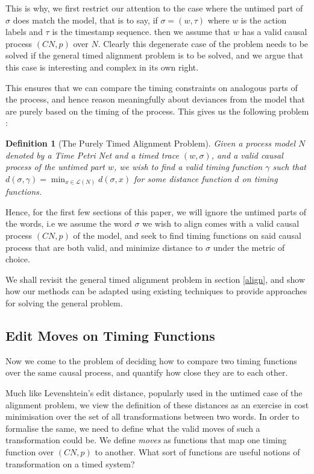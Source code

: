 \documentclass[conference]{IEEEtran}
\newtheorem{definition}{Definition}
\begin{document}
	
	This is why, we first restrict our attention to the case where the untimed part of $\sigma$ does match the model, that is to say, if $\sigma = (w, \tau)$ where $w$ is the action labels and $\tau$ is the timestamp sequence. then we assume that $w$ has a valid causal process $(CN, p)$ over $N$. Clearly this degenerate case of the problem needs to be solved if the general timed alignment problem is to be solved, and we argue that this case is interesting and complex in its own right. 
	
	This ensures that we can compare the timing constraints on analogous parts of the process, and hence reason meaningfully about deviances from the model that are purely based on the timing of the process. This gives us the following problem : 
	
	\begin{definition}[The Purely Timed Alignment Problem]
		Given a process model $N$ denoted by a Time Petri Net and a timed trace $(w, \sigma)$, and a valid causal process of the untimed part $w$, we wish to find a valid timing function $\gamma$ such that $d(\sigma, \gamma) =\min_{x \in \mathcal{L}(N)}{d(\sigma, x)}$ for some distance function $d$ on timing functions. 
	\end{definition}
	
	Hence, for the first few sections of this paper, we will ignore the untimed parts of the words, i.e we assume the word $\sigma$ we wish to align comes with a valid causal process $(CN, p)$ of the model, and seek to find timing functions on said causal process that are both valid, and minimize distance to $\sigma$ under the metric of choice. 
	
	We shall revisit the general timed alignment problem in section \ref{align}, and show how our methods 
	can be adapted using existing techniques to provide approaches for solving the general 
	problem. 
	
	\subsection{Edit Moves on Timing Functions}\label{dualrep}
	Now we come to the problem of deciding how to compare two timing functions over the same causal process, and quantify how close they are to each other. 
	
	Much like Levenshtein's edit distance, popularly used in the untimed case of the alignment problem, we view the definition of these distances as an exercise in cost minimisation over the set of all transformations between two words. 
	In order to formalise the same, we need to define what the valid moves of such a transformation could be. 
	We define \textit{moves} as functions that map one timing function over $(CN, p)$ to another. 
	What sort of functions are useful notions of transformation on a timed system? 
	
\end{document}
